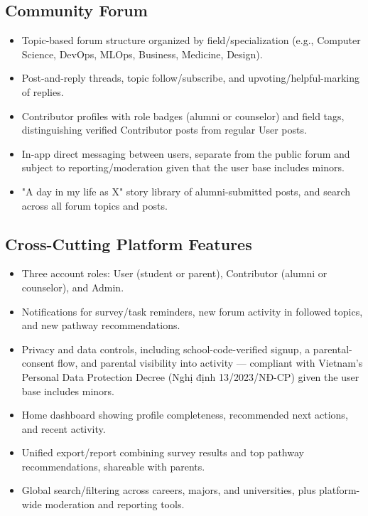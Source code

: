 \documentclass[a4paper]{article}
\begin{document}
\subsection{Community Forum}
\begin{itemize}
    \item Topic-based forum structure organized by field/specialization (e.g., Computer
    Science, DevOps, MLOps, Business, Medicine, Design).
    \item Post-and-reply threads, topic follow/subscribe, and upvoting/helpful-marking of
    replies.
    \item Contributor profiles with role badges (alumni or counselor) and field tags,
    distinguishing verified Contributor posts from regular User posts.
    \item In-app direct messaging between users, separate from the public forum and subject to
    reporting/moderation given that the user base includes minors.
    \item "A day in my life as X" story library of alumni-submitted posts, and search across
    all forum topics and posts.
\end{itemize}

\subsection{Cross-Cutting Platform Features}
\begin{itemize}
    \item Three account roles: User (student or parent), Contributor (alumni or counselor), and
    Admin.
    \item Notifications for survey/task reminders, new forum activity in followed topics, and
    new pathway recommendations.
    \item Privacy and data controls, including school-code-verified signup, a parental-consent
    flow, and parental visibility into activity --- compliant with Vietnam's Personal Data
    Protection Decree (Nghị định 13/2023/NĐ-CP) given the user base includes
    minors.
    \item Home dashboard showing profile completeness, recommended next actions, and recent
    activity.
    \item Unified export/report combining survey results and top pathway recommendations,
    shareable with parents.
    \item Global search/filtering across careers, majors, and universities, plus
    platform-wide moderation and reporting tools.
\end{itemize}
\end{document}
